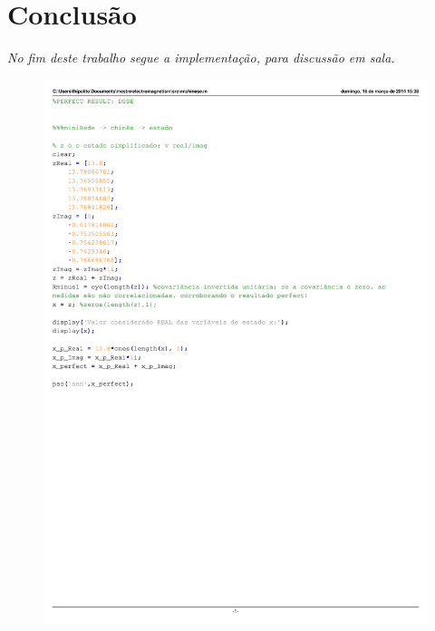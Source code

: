 \documentclass{IEEEtran}
\begin{document}
\section{Conclusão}
\textit{No fim deste trabalho segue a implementação, para discussão em sala.}
\begin{figure}
	\centering
	\includegraphics{chinese.pdf}
	\label{chinese}
\end{figure}
\end{document}
